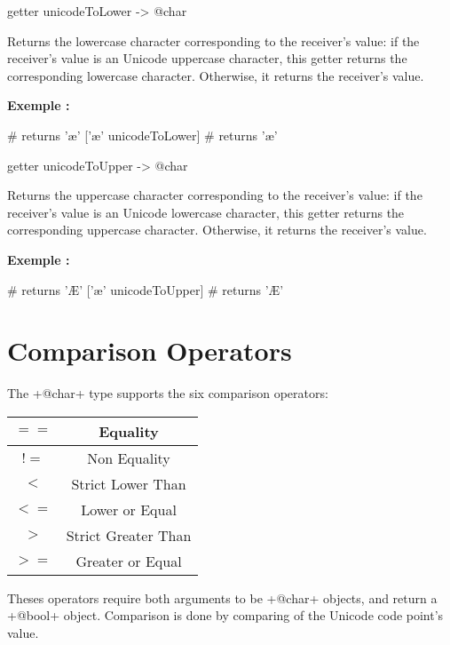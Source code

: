 
\begin{galgas}
getter unicodeToLower -> @char
\end{galgas}

Returns the lowercase character corresponding to the receiver's value: if the receiver's value is an Unicode uppercase character, this getter returns the corresponding lowercase character. Otherwise, it returns the receiver's value.

\textbf{Exemple :}
\begin{galgas}
['Æ' unicodeToLower] # returns 'æ'
['æ' unicodeToLower] # returns 'æ'
\end{galgas}





\begin{galgas}
getter unicodeToUpper -> @char
\end{galgas}

Returns the uppercase character corresponding to the receiver's value: if the receiver's value is an Unicode lowercase character, this getter returns the corresponding uppercase character. Otherwise, it returns the receiver's value.

\textbf{Exemple :}
\begin{galgas}
['Æ' unicodeToUpper] # returns 'Æ'
['æ' unicodeToUpper] # returns 'Æ'
\end{galgas}





\section{Comparison Operators}

The \ggs+@char+ type supports the six comparison operators:\newline

\begin{tabular}{|c|c|}
\hline
$==$ & Equality \\
\hline
$!=$ & Non Equality \\
\hline
$<$  & Strict Lower Than \\
\hline
$<=$  & Lower or Equal \\
\hline
$>$  & Strict Greater Than \\
\hline
$>=$  & Greater or Equal \\
\hline
\end{tabular}

Theses operators require both arguments to be \ggs+@char+ objects, and return a \ggs+@bool+ object. Comparison is done by comparing of the Unicode code point's value.


